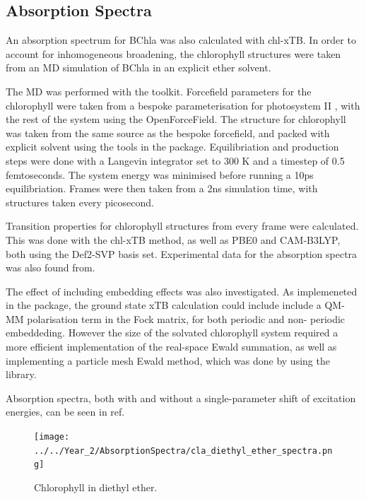 \subsection{Absorption Spectra}
\label{subsec:absorption_spectra}

An absorption spectrum for BChla was also calculated with chl-xTB. In order to
account for inhomogeneous broadening, the chlorophyll structures were taken from
an MD simulation of BChla in an explicit ether solvent.

The MD was performed with the  toolkit. Forcefield parameters for the
chlorophyll were taken from a bespoke parameterisation for photosystem II \cite{Zhang2012},
with the rest of the system using the OpenForceField. The structure for chlorophyll 
was taken from the same source as the bespoke forcefield, and packed with explicit
solvent using the tools in the  package. Equilibriation and production
steps were done with a Langevin integrator set to 300 K  and a timestep of 0.5
femtoseconds. The system energy was minimised before running a 10ps equilibriation.
Frames were then taken from a 2ns simulation time, with structures taken every picosecond.

Transition properties for chlorophyll structures from every frame were calculated.
This was done with the chl-xTB method, as well as PBE0 and CAM-B3LYP, both using 
the Def2-SVP basis set. Experimental data for the absorption spectra was also found
from.

The effect of including embedding effects was also investigated. As implemeneted
in the  package, the ground state xTB calculation could include
include a QM-MM polarisation term in the Fock matrix, for both periodic and non-
periodic embeddeding. However the size of the solvated chlorophyll system required 
a more efficient implementation of the real-space Ewald summation, as well as implementing
a particle mesh Ewald method, which was done by using the  library.

Absorption spectra, both with and without a single-parameter shift of excitation
energies, can be seen in ref. 

\begin{figure}
    \centering
    \texttt{[image: ../../Year\_2/AbsorptionSpectra/cla\_diethyl\_ether\_spectra.png]}
    \caption{Chlorophyll in diethyl ether.}
    \label{fig:chl_diethyl_ether}
\end{figure}

